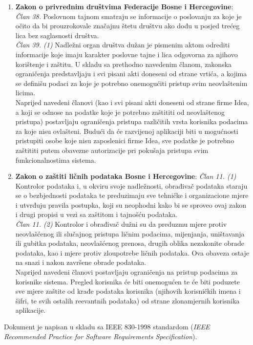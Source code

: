 \documentclass[12pt,a4paper]{article}
\begin{document}
\begin{enumerate}
\item \textbf{Zakon o privrednim društvima Federacije Bosne i Hercegovine}: \\
\textit{Član 38.} Poslovnom tajnom smatraju se informacije o poslovanju za koje je očito da bi prouzrokovale značajnu štetu društvu ako dođu u posjed trećeg lica bez saglasnosti društva. \\
\textit{Član 39. (1)} Nadležni organ društva dužan je pismenim aktom odrediti informacije koje imaju karakter poslovne tajne i lica odgovorna za njihovo korištenje i zaštitu.
U skladu sa prethodno navedenim članom, zakonska ograničenja predstavljaju i svi pisani akti doneseni od strane vrtića, a kojima se definišu podaci za koje je potrebno onemogućiti pristup svim neovlaštenim licima. \\
Naprijed navedeni članovi (kao i svi pisani akti doneseni od strane firme Idea, a koji se odnose na podatke koje je potrebno zaštititi od neovlaštenog pristupa) postavljaju ograničenja pristupa različitih vrsta korisnika podacima za koje nisu ovlašteni. Budući da će razvijenoj aplikaciji biti u mogućnosti pristupiti osobe koje nisu zaposlenici firme Idea, sve podatke je potrebno zaštititi putem obavezne autorizacije pri pokušaja pristupa svim funkcionalnostima sistema.
\item \textbf{Zakon o zaštiti ličnih podataka Bosne i Hercegovine}:
\textit{Član 11. (1)} Kontrolor podataka i, u okviru svoje nadležnosti, obrađivač podataka staraju se o bezbjednosti podataka te preduzimaju sve tehničke i organizacione mjere i utvrđuju pravila postupka, koji su neophodni kako bi se sproveo ovaj zakon i drugi propisi u vezi sa zaštitom i tajnošću podataka. \\
\textit{Član 11. (2)} Kontrolor i obrađivač dužni su da preduzmu mjere protiv neovlašćenog ili slučajnog pristupa ličnim podacima, mijenjanja, uništavanja ili gubitka podataka, neovlašćenog prenosa, drugih oblika nezakonite obrade podataka, kao i mjere protiv zloupotrebe ličnih podataka. Ova obaveza ostaje na snazi i nakon završene obrade podataka. \\
Naprijed navedeni članovi postavljaju ograničenja na pristup podacima za korisnike sistema. Pregled korisnika će biti onemogućen te će biti poduzete sve mjere zaštite od krađe podataka korisnika (njihovih korisničkih imena i šifri, te svih ostalih reevantnih podataka) od strane zlonamjernih korisnika aplikacije. \\
\end{enumerate}

Dokument je napisan u skladu sa IEEE 830-1998 standardom (\textit{IEEE Recommended Practice for Software Requirements Specification}).
\end{document}
